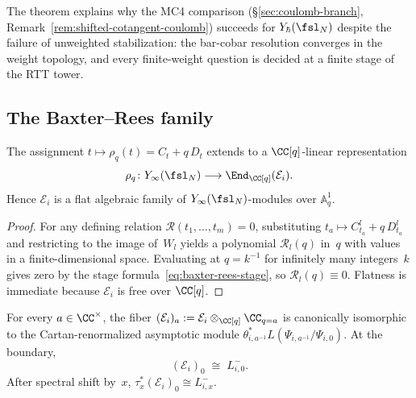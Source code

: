 \begin{remark}
\label{rem:yangian-correct-MC4}
The theorem explains why the MC4 comparison
(\S\ref{sec:coulomb-branch}, Remark~\ref{rem:shifted-cotangent-coulomb})
succeeds for $Y_\hbar(\fsl_N)$ despite the failure of unweighted
stabilization: the bar-cobar resolution converges in the weight
topology, and every finite-weight question is decided at a finite
stage of the RTT tower.
\end{remark}

\subsection{The Baxter--Rees family}

\begin{theorem}
\label{thm:yangian-baxter-rees-algebraicity}
The assignment $t \mapsto \rho_q(t) = C_t + q\,D_t$ extends to a
$\CC[q]$-linear representation
\begin{equation}\label{eq:baxter-rees-representation}
 \rho_q \colon Y_\infty(\fsl_N)
 \longrightarrow
 \End_{\CC[q]}(\mathcal{E}_i).
\end{equation}
Hence $\mathcal{E}_i$ is a flat algebraic family of
$Y_\infty(\fsl_N)$-modules over $\mathbb{A}^1_q$.
\end{theorem}

\begin{proof}
For any defining relation $\mathscr{R}(t_1,\dots,t_m) = 0$,
substituting $t_a \mapsto C_{t_a}^l + q\,D_{t_a}^l$ and restricting
to the image of~$W_l$ yields a polynomial $\mathscr{R}_l(q)$ in~$q$
with values in a finite-dimensional space. Evaluating at
$q = k^{-1}$ for infinitely many integers~$k$ gives zero by the
stage formula~\eqref{eq:baxter-rees-stage}, so
$\mathscr{R}_l(q) \equiv 0$. Flatness is immediate because
$\mathcal{E}_i$ is free over $\CC[q]$.
\end{proof}

\begin{theorem}
\label{thm:yangian-generic-boundary-fibers}
For every $a \in \CC^\times$, the fiber
$(\mathcal{E}_i)_a := \mathcal{E}_i \otimes_{\CC[q]} \CC_{q=a}$ is
canonically isomorphic to the Cartan-renormalized asymptotic module
$\theta_{i,a^{-1}}^* L(\Psi_{i,a^{-1}}/\Psi_{i,0})$.
At the boundary,
\begin{equation}\label{eq:baxter-rees-boundary-fiber}
 (\mathcal{E}_i)_0 \;\cong\; L^-_{i,0}.
\end{equation}
After spectral shift by~$x$,
$\tau_x^*(\mathcal{E}_i)_0 \cong L^-_{i,x}$.
\end{theorem}

